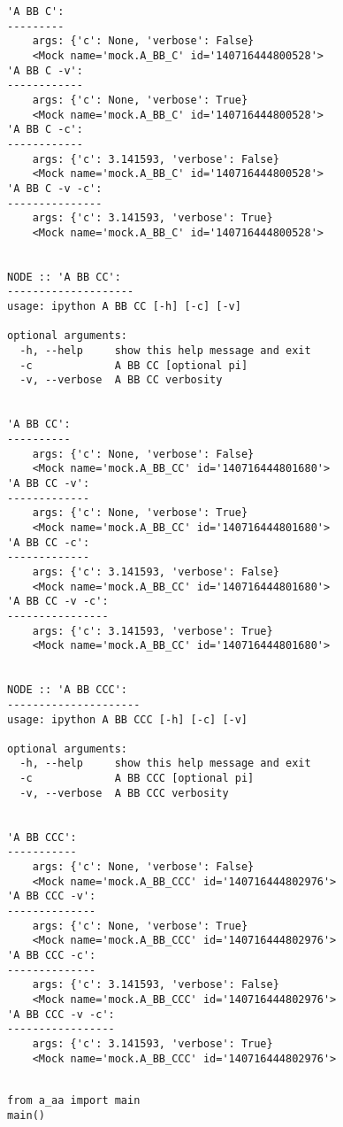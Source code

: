 \documentclass[10pt]{amsart}
\numberwithin{equation}{section}
\begin{document}
\begin{verbatim}
'A BB C':
---------
	args: {'c': None, 'verbose': False}
	<Mock name='mock.A_BB_C' id='140716444800528'>
'A BB C -v':
------------
	args: {'c': None, 'verbose': True}
	<Mock name='mock.A_BB_C' id='140716444800528'>
'A BB C -c':
------------
	args: {'c': 3.141593, 'verbose': False}
	<Mock name='mock.A_BB_C' id='140716444800528'>
'A BB C -v -c':
---------------
	args: {'c': 3.141593, 'verbose': True}
	<Mock name='mock.A_BB_C' id='140716444800528'>


NODE :: 'A BB CC':
--------------------
usage: ipython A BB CC [-h] [-c] [-v]

optional arguments:
  -h, --help     show this help message and exit
  -c             A BB CC [optional pi]
  -v, --verbose  A BB CC verbosity


'A BB CC':
----------
	args: {'c': None, 'verbose': False}
	<Mock name='mock.A_BB_CC' id='140716444801680'>
'A BB CC -v':
-------------
	args: {'c': None, 'verbose': True}
	<Mock name='mock.A_BB_CC' id='140716444801680'>
'A BB CC -c':
-------------
	args: {'c': 3.141593, 'verbose': False}
	<Mock name='mock.A_BB_CC' id='140716444801680'>
'A BB CC -v -c':
----------------
	args: {'c': 3.141593, 'verbose': True}
	<Mock name='mock.A_BB_CC' id='140716444801680'>


NODE :: 'A BB CCC':
---------------------
usage: ipython A BB CCC [-h] [-c] [-v]

optional arguments:
  -h, --help     show this help message and exit
  -c             A BB CCC [optional pi]
  -v, --verbose  A BB CCC verbosity


'A BB CCC':
-----------
	args: {'c': None, 'verbose': False}
	<Mock name='mock.A_BB_CCC' id='140716444802976'>
'A BB CCC -v':
--------------
	args: {'c': None, 'verbose': True}
	<Mock name='mock.A_BB_CCC' id='140716444802976'>
'A BB CCC -c':
--------------
	args: {'c': 3.141593, 'verbose': False}
	<Mock name='mock.A_BB_CCC' id='140716444802976'>
'A BB CCC -v -c':
-----------------
	args: {'c': 3.141593, 'verbose': True}
	<Mock name='mock.A_BB_CCC' id='140716444802976'>


\end{verbatim}

\begin{verbatim}
from a_aa import main
main()
\end{verbatim}
\end{document}
